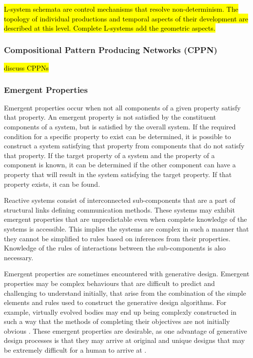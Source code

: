 \hl{L-system schemata are control mechanisms that resolve non-determinism. The topology of individual productions and temporal aspects of their development are described at this level. Complete L-systems add the geometric aspects.} \cite{Prusinkiewicz2004}

\subsubsection{Compositional Pattern Producing Networks (CPPN)}

\hl{discuss CPPNs}

\subsubsection{Emergent Properties}

Emergent properties occur when not all components of a given property satisfy that property. An emergent property is not satisfied by the constituent components of a system, but is satisfied by the overall system. If the required condition for a specific property to exist can be determined, it is possible to construct a system satisfying that property from components that do not satisfy that property. If the target property of a system and the property of a component is known, it can be determined if the other component can have a property that will result in the system satisfying the target property. If that property exists, it can be found. \cite{Zakinthinos1998}

Reactive systems consist of interconnected sub-components that are a part of structural links defining communication methods. These systems may exhibit emergent properties that are unpredictable even when complete knowledge of the systems is accessible. This implies the systems are complex in such a manner that they cannot be simplified to rules based on inferences from their properties. Knowledge of the rules of interactions between the sub-components is also necessary. \cite{Aiguier2008}

Emergent properties are sometimes encountered with generative design. Emergent properties may be complex behaviours that are difficult to predict \cite{Aiguier2008} and challenging to understand initially, that arise from the combination of the simple elements and rules used to construct the generative design algorithms. For example, virtually evolved bodies may end up being complexly constructed in such a way that the methods of completing their objectives are not initially obvious \cite{Damper2000}. These emergent properties are desirable, as one advantage of generative design processes is that they may arrive at original and unique designs that may be extremely difficult for a human to arrive at \cite{Sims1994a}.


